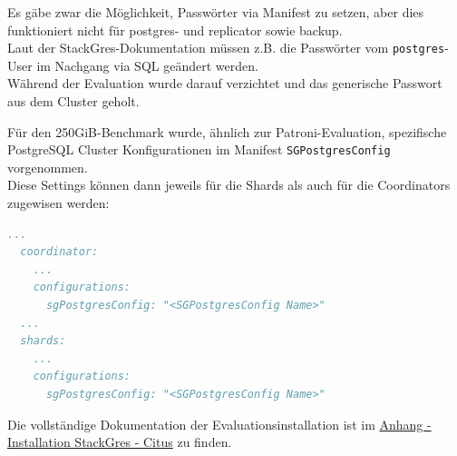 \begin{flushleft}
    Es gäbe zwar die Möglichkeit, Passwörter via Manifest zu setzen, aber dies funktioniert nicht für postgres- und replicator sowie backup.\\
    Laut der StackGres-Dokumentation müssen z.B. die Passwörter vom \texttt{postgres}-User im Nachgang via SQL geändert werden.\\
    Während der Evaluation wurde darauf verzichtet und das generische Passwort aus dem Cluster geholt.
\end{flushleft}
\begin{flushleft}
    Für den 250GiB-Benchmark wurde, ähnlich zur Patroni-Evaluation, spezifische \Gls{PostgreSQL Cluster} Konfigurationen im Manifest \texttt{SGPostgresConfig} vorgenommen.\\
    Diese Settings können dann jeweils für die Shards als auch für die Coordinators zugewisen werden:
    \lstset{style=gra_codestyle}
    \begin{lstlisting}[language=yaml, caption=StackGres-Citus - SGPostgresConfig,captionpos=b,label={lst:stackgres-citus-SGPostgresConfig-profile},breaklines=true]
  ...
  coordinator:
    ...
    configurations:
      sgPostgresConfig: "<SGPostgresConfig Name>"
  ...
  shards:
    ...
    configurations:
      sgPostgresConfig: "<SGPostgresConfig Name>"
    \end{lstlisting}
\end{flushleft}
\begin{flushleft}
    Die vollständige Dokumentation der Evaluationsinstallation ist im \hyperref[subsec:evaluation_installation_stackgres]{Anhang - Installation StackGres - Citus} zu finden.
\end{flushleft}